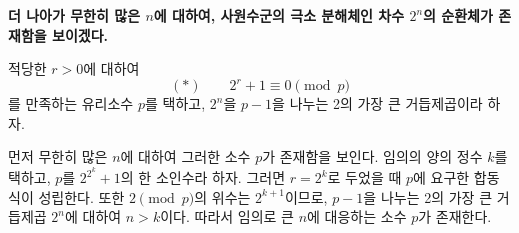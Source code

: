 \documentclass[11pt]{article}
\providecommand{\srcspaced}[1]{\textbf{#1}}
\begin{document}
\srcspaced{더 나아가 무한히 많은 $n$에 대하여, 사원수군의 극소 분해체인 차수 $2^n$의 순환체가 존재함을 보이겠다.}

적당한 $r>0$에 대하여
\[
        (*)\qquad 2^r+1\equiv0\pmod p
\]
를 만족하는 유리소수 $p$를 택하고, $2^n$을 $p-1$을 나누는 2의 가장 큰 거듭제곱이라 하자.

먼저 무한히 많은 $n$에 대하여 그러한 소수 $p$가 존재함을 보인다. 임의의 양의 정수 $k$를 택하고, $p$를 $2^{2^k}+1$의 한 소인수라 하자. 그러면 $r=2^k$로 두었을 때 $p$에 요구한 합동식이 성립한다. 또한 $2\pmod p$의 위수는 $2^{k+1}$이므로, $p-1$을 나누는 2의 가장 큰 거듭제곱 $2^n$에 대하여 $n>k$이다. 따라서 임의로 큰 $n$에 대응하는 소수 $p$가 존재한다.
\end{document}
